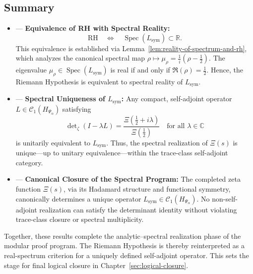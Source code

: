 \subsection*{Summary}

\begin{itemize}
  \item {} — \textbf{Equivalence of RH with Spectral Reality:}
  \[
  \mathrm{RH} \quad \Longleftrightarrow \quad \operatorname{Spec}(L_{\mathrm{sym}}) \subset \mathbb{R}.
  \]
  This equivalence is established via Lemma~\ref{lem:reality-of-spectrum-and-rh}, which analyzes the canonical spectral map \( \rho \mapsto \mu_\rho = \tfrac{1}{i}(\rho - \tfrac{1}{2}) \). The eigenvalue \( \mu_\rho \in \operatorname{Spec}(L_{\mathrm{sym}}) \) is real if and only if \( \Re(\rho) = \tfrac{1}{2} \). Hence, the Riemann Hypothesis is equivalent to spectral reality of \( L_{\mathrm{sym}} \).

  \item {} — \textbf{Spectral Uniqueness of \( L_{\mathrm{sym}} \):}
  Any compact, self-adjoint operator \( L \in \mathcal{C}_1(H_{\Psi_\alpha}) \) satisfying
  \[
  \det\nolimits_\zeta(I - \lambda L)
  = \frac{\Xi\left(\tfrac{1}{2} + i\lambda\right)}{\Xi\left(\tfrac{1}{2}\right)} \quad \text{for all } \lambda \in \mathbb{C}
  \]
  is unitarily equivalent to \( L_{\mathrm{sym}} \). Thus, the spectral realization of \( \Xi(s) \) is unique—up to unitary equivalence—within the trace-class self-adjoint category.

  \item {} — \textbf{Canonical Closure of the Spectral Program:}
  The completed zeta function \( \Xi(s) \), via its Hadamard structure and functional symmetry, canonically determines a unique operator \( L_{\mathrm{sym}} \in \mathcal{C}_1(H_{\Psi_\alpha}) \). No non-self-adjoint realization can satisfy the determinant identity without violating trace-class closure or spectral multiplicity.
\end{itemize}

\medskip

Together, these results complete the analytic–spectral realization phase of the modular proof program. The Riemann Hypothesis is thereby reinterpreted as a real-spectrum criterion for a uniquely defined self-adjoint operator. This sets the stage for final logical closure in Chapter~\ref{sec:logical-closure}.
